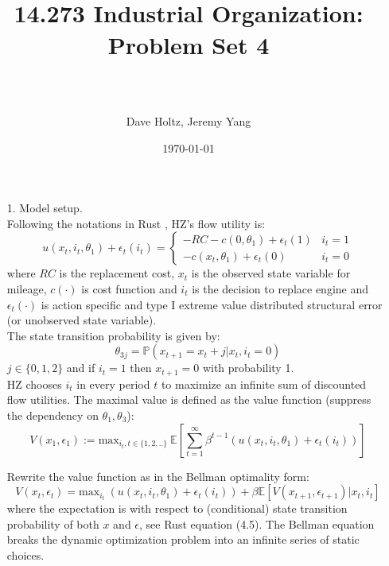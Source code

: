\documentclass[paper=a4, fontsize=11pt]{scrartcl} %
\title{
\normalfont \normalsize

\horrule{0.5pt} \\[0.4cm] %
\huge 14.273 Industrial Organization: Problem Set 4 \\ %
\horrule{.5pt} \\[0.4cm] %
}
\author{Dave Holtz, Jeremy Yang} %
\date{\normalsize\today} %
\numberwithin{equation}{section} %
\numberwithin{figure}{section} %
\numberwithin{table}{section} %
\begin{document}
\maketitle
\begin{itemize}
\item[1.] Model setup.\\

Following the notations in Rust \cite{rust1987optimal}, HZ's flow utility is:
\[u(x_t,i_t,\theta_1)+\epsilon_t(i_t) =
\begin{cases}
-RC-c(0,\theta_1)+\epsilon_t(1) & i_t = 1\\
-c(x_t,\theta_1)+\epsilon_t(0) & i_t=0
\end{cases}\]
where $RC$ is the replacement cost, $x_t$ is the observed state variable for mileage, $c(\cdot)$ is cost function and $i_t$ is the decision to replace engine and $\epsilon_t(\cdot)$ is action specific and type I extreme value distributed structural error (or unobserved state variable).\\

The state transition probability is given by:
\[\theta_{3j} = \mathbb{P}(x_{t+1}=x_t+j|x_t,i_t=0)\]
$j \in \{0,1,2\}$ and if $i_{t}=1$ then $x_{t+1}=0$ with probability 1.\\

HZ chooses $i_t$ in every period $t$ to maximize an infinite sum of discounted flow utilities. The maximal value is defined as the value function (suppress the dependency on $\theta_1, \theta_3$):
\[V(x_1,\epsilon_1) := \text{max}_{i_t, t\in\{1,2,..\}}\ \mathbb{E}[\sum_{t=1}^\infty \beta^{t-1} (u(x_t,i_t,\theta_1)+\epsilon_t(i_t))]\]

Rewrite the value function as in the Bellman optimality form:
\[V(x_t, \epsilon_t) = \text{max}_{i_t} \ (u(x_t,i_t,\theta_1)+\epsilon_t(i_t)) + \beta \mathbb{E}[V(x_{t+1},\epsilon_{t+1})|x_t, i_t]\]
where the expectation is with respect to (conditional) state transition probability of both $x$ and $\epsilon$, see Rust \cite{rust1987optimal} equation (4.5). The Bellman equation breaks the dynamic optimization problem into an infinite series of static choices.



\end{itemize}
\end{document}
